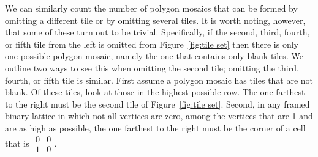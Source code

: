 \documentclass[12pt]{article}
\theoremstyle{plain}
\theoremstyle{remark}
\theoremstyle{definition}
\theoremstyle{remark}
\theoremstyle{definition}
\begin{document}
We can similarly count the number of polygon mosaics that can be formed by omitting a different tile or by omitting several tiles. It is worth noting, however, that some of these turn out to be trivial. Specifically, if the second, third, fourth, or fifth tile from the left is omitted from Figure~\ref{fig:tile set} then there is only one possible polygon mosaic, namely the one that contains only blank tiles. We outline two ways to see this when omitting the second tile; omitting the third, fourth, or fifth tile is similar. First assume a polygon mosaic has tiles that are not blank. Of these tiles, look at those in the highest possible row. The one farthest to the right must be the second tile of Figure~\ref{fig:tile set}. Second, in any framed binary lattice in which not all vertices are zero, among the vertices that are 1 and are as high as possible, the one farthest to the right must be the corner of a cell that is $\begin{smallmatrix}0&0\\ 1&0\end{smallmatrix}$.
\end{document}
